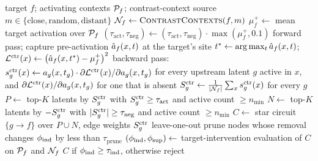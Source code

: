 \documentclass[10pt]{article}
\begin{document}
\begin{algorithm}
\caption{Contrastive gradient discovery (one target $f$)}
\label{alg:cfgrad}
\begin{algorithmic}[1]
\Require target $f$; activating contexts $\mathcal{P}_f$; contrast-context source $m \in \{\text{close}, \text{random}, \text{distant}\}$
\State $\mathcal{N}_f \gets \textsc{ContrastContexts}(f, m)$ 
\State $\mu_f^{+} \gets$ mean target activation over $\mathcal{P}_f$
\State $(\tau_{\mathrm{act}}, \tau_{\mathrm{neg}}) \gets (\tau_{\mathrm{act}}, \tau_{\mathrm{neg}}) \cdot \max(\mu_f^{+}, 0.1)$ 
    \State forward pass; capture pre-activation $\hat{a}_f(x, t)$ at the target's site
    \State $t^{*} \gets \arg\max_t \hat{a}_f(x, t)$;\quad $\mathcal{L}^{\mathrm{ctr}}(x) \gets \bigl(\hat{a}_f(x, t^{*}) - \mu_f^{+}\bigr)^{2}$
    \State backward pass: $s_g^{\mathrm{ctr}}(x) \gets a_g(x, t_g) \cdot \partial \mathcal{L}^{\mathrm{ctr}}(x) / \partial a_g(x, t_g)$ for every upstream latent $g$ active in $x$, and $\partial \mathcal{L}^{\mathrm{ctr}}(x) / \partial a_g(x, t_g)$ for one that is absent 
\EndFor
\State $S_g^{\mathrm{ctr}} \gets \frac{1}{|\mathcal{N}_f|}\sum_{x} s_g^{\mathrm{ctr}}(x)$ for every $g$
\State $P \gets$ top-$K$ latents by $S_g^{\mathrm{ctr}}$ with $S_g^{\mathrm{ctr}} \geq \tau_{\mathrm{act}}$ and active count $\geq n_{\min}$
\State $N \gets$ top-$K$ latents by $-S_g^{\mathrm{ctr}}$ with $|S_g^{\mathrm{ctr}}| \geq \tau_{\mathrm{neg}}$ and active count $\geq n_{\min}$
\State $C \gets$ star circuit $\{g \to f\}$ over $P \cup N$, edge weights $S_g^{\mathrm{ctr}}$
    \State leave-one-out prune nodes whose removal changes $\phi_{\mathrm{ind}}$ by less than $\tau_{\mathrm{prune}}$
\EndIf
\State $(\phi_{\mathrm{ind}}, \phi_{\mathrm{sup}}) \gets$ target-intervention evaluation of $C$ on $\mathcal{P}_f$ and $\mathcal{N}_f$
\State \Return $C$ if $\phi_{\mathrm{ind}} \geq \tau_{\mathrm{ind}}$, otherwise reject
\end{algorithmic}
\end{algorithm}
\end{document}
